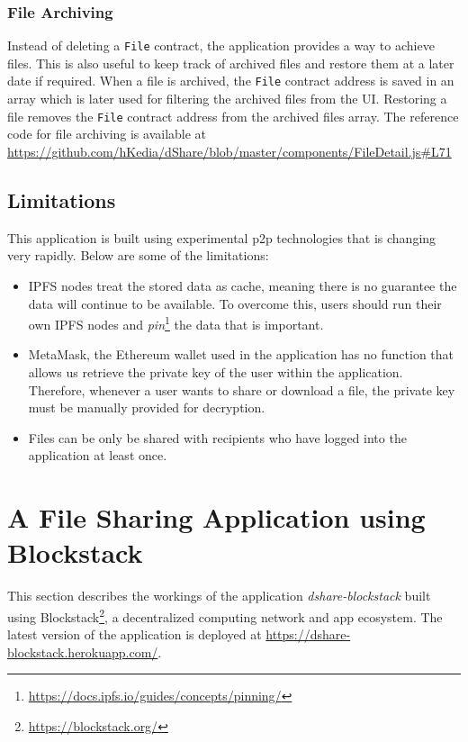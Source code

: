 			\subsubsection{File Archiving}
				Instead of deleting a \texttt{File} contract, the application provides a way to achieve files. This is also useful to keep track of archived files and restore them at a later date if required. When a file is archived, the \texttt{File} contract address is saved in an array which is later used for filtering the archived files from the UI. Restoring a file removes the \texttt{File} contract address from the archived files array. The reference code for file archiving is available at \url{https://github.com/hKedia/dShare/blob/master/components/FileDetail.js#L71}
				
		\subsection{Limitations}
			This application is built using experimental p2p technologies that is changing very rapidly. Below are some of the limitations:
			
			\begin{itemize}
				\item IPFS nodes treat the stored data as cache, meaning there is no guarantee the data will continue to be available. To overcome this, users should run their own IPFS nodes and \textit{pin}\footnote{\url{https://docs.ipfs.io/guides/concepts/pinning/}} the data that is important.
				
				\item MetaMask, the Ethereum wallet used in the application has no function that allows us retrieve the private key of the user within the application. Therefore, whenever a user wants to share or download a file, the private key must be manually provided for decryption.
				
				\item Files can be only be shared with recipients who have logged into the application at least once.
			\end{itemize}
			
	\section{A File Sharing Application using Blockstack}
		This section describes the workings of the application \textit{dshare-blockstack}\cite{harsh_kedia_2019_3359854} built using Blockstack\footnote{\url{https://blockstack.org/}}, a decentralized computing network and app ecosystem. The latest version of the application is deployed at \url{https://dshare-blockstack.herokuapp.com/}.
		
